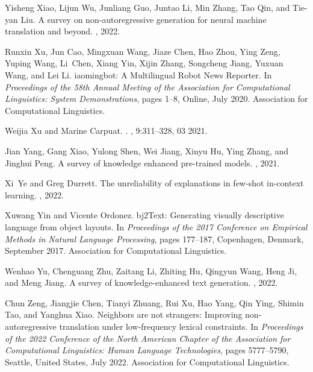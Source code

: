 \documentclass[11pt]{article}
\begin{document}
\begin{thebibliography}{100}
Yisheng Xiao, Lijun Wu, Junliang Guo, Juntao Li, Min Zhang, Tao Qin, and
  Tie-yan Liu.
\newblock A survey on non-autoregressive generation for neural machine
  translation and beyond.
, 2022.

Runxin Xu, Jun Cao, Mingxuan Wang, Jiaze Chen, Hao Zhou, Ying Zeng, Yuping
  Wang, Li~Chen, Xiang Yin, Xijin Zhang, Songcheng Jiang, Yuxuan Wang, and Lei
  Li.
iaomingbot: {A} {M}ultilingual {R}obot {N}ews {R}eporter.
\newblock In {\em Proceedings of the 58th Annual Meeting of the Association for
  Computational Linguistics: System Demonstrations}, pages 1--8, Online, July
  2020. Association for Computational Linguistics.

Weijia Xu and Marine Carpuat.
.
,
  9:311--328, 03 2021.

Jian Yang, Gang Xiao, Yulong Shen, Wei Jiang, Xinyu Hu, Ying Zhang, and Jinghui
  Peng.
\newblock A survey of knowledge enhanced pre-trained models.
, 2021.

Xi~Ye and Greg Durrett.
\newblock The unreliability of explanations in few-shot in-context learning.
, 2022.

Xuwang Yin and Vicente Ordonez.
bj2{T}ext: Generating visually descriptive language from object
  layouts.
\newblock In {\em Proceedings of the 2017 Conference on Empirical Methods in
  Natural Language Processing}, pages 177--187, Copenhagen, Denmark, September
  2017. Association for Computational Linguistics.

Wenhao Yu, Chenguang Zhu, Zaitang Li, Zhiting Hu, Qingyun Wang, Heng Ji, and
  Meng Jiang.
\newblock A survey of knowledge-enhanced text generation.
, 2022.

Chun Zeng, Jiangjie Chen, Tianyi Zhuang, Rui Xu, Hao Yang, Qin Ying, Shimin
  Tao, and Yanghua Xiao.
\newblock Neighbors are not strangers: Improving non-autoregressive translation
  under low-frequency lexical constraints.
\newblock In {\em Proceedings of the 2022 Conference of the North American
  Chapter of the Association for Computational Linguistics: Human Language
  Technologies}, pages 5777--5790, Seattle, United States, July 2022.
  Association for Computational Linguistics.


\end{thebibliography}
\end{document}
